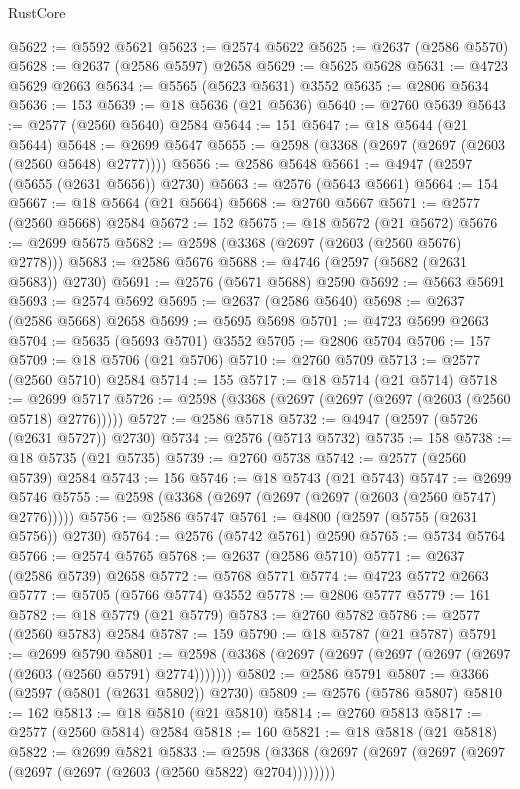 \begin{lexlean}{RustCore}
\begin{coremodule}
@5622 := @5592 @5621
@5623 := @2574 @5622
@5625 := @2637 (@2586 @5570)
@5628 := @2637 (@2586 @5597) @2658
@5629 := @5625 @5628
@5631 := @4723 @5629 @2663
@5634 := @5565 (@5623 @5631) @3552
@5635 := @2806 @5634
@5636 := 153
@5639 := @18 @5636 (@21 @5636)
@5640 := @2760 @5639
@5643 := @2577 (@2560 @5640) @2584
@5644 := 151
@5647 := @18 @5644 (@21 @5644)
@5648 := @2699 @5647
@5655 := @2598 (@3368 (@2697 (@2697 (@2603 (@2560 @5648) @2777))))
@5656 := @2586 @5648
@5661 := @4947 (@2597 (@5655 (@2631 @5656)) @2730)
@5663 := @2576 (@5643 @5661)
@5664 := 154
@5667 := @18 @5664 (@21 @5664)
@5668 := @2760 @5667
@5671 := @2577 (@2560 @5668) @2584
@5672 := 152
@5675 := @18 @5672 (@21 @5672)
@5676 := @2699 @5675
@5682 := @2598 (@3368 (@2697 (@2603 (@2560 @5676) @2778)))
@5683 := @2586 @5676
@5688 := @4746 (@2597 (@5682 (@2631 @5683)) @2730)
@5691 := @2576 (@5671 @5688) @2590
@5692 := @5663 @5691
@5693 := @2574 @5692
@5695 := @2637 (@2586 @5640)
@5698 := @2637 (@2586 @5668) @2658
@5699 := @5695 @5698
@5701 := @4723 @5699 @2663
@5704 := @5635 (@5693 @5701) @3552
@5705 := @2806 @5704
@5706 := 157
@5709 := @18 @5706 (@21 @5706)
@5710 := @2760 @5709
@5713 := @2577 (@2560 @5710) @2584
@5714 := 155
@5717 := @18 @5714 (@21 @5714)
@5718 := @2699 @5717
@5726 := @2598 (@3368 (@2697 (@2697 (@2697 (@2603 (@2560 @5718) @2776)))))
@5727 := @2586 @5718
@5732 := @4947 (@2597 (@5726 (@2631 @5727)) @2730)
@5734 := @2576 (@5713 @5732)
@5735 := 158
@5738 := @18 @5735 (@21 @5735)
@5739 := @2760 @5738
@5742 := @2577 (@2560 @5739) @2584
@5743 := 156
@5746 := @18 @5743 (@21 @5743)
@5747 := @2699 @5746
@5755 := @2598 (@3368 (@2697 (@2697 (@2697 (@2603 (@2560 @5747) @2776)))))
@5756 := @2586 @5747
@5761 := @4800 (@2597 (@5755 (@2631 @5756)) @2730)
@5764 := @2576 (@5742 @5761) @2590
@5765 := @5734 @5764
@5766 := @2574 @5765
@5768 := @2637 (@2586 @5710)
@5771 := @2637 (@2586 @5739) @2658
@5772 := @5768 @5771
@5774 := @4723 @5772 @2663
@5777 := @5705 (@5766 @5774) @3552
@5778 := @2806 @5777
@5779 := 161
@5782 := @18 @5779 (@21 @5779)
@5783 := @2760 @5782
@5786 := @2577 (@2560 @5783) @2584
@5787 := 159
@5790 := @18 @5787 (@21 @5787)
@5791 := @2699 @5790
@5801 := @2598 (@3368 (@2697 (@2697 (@2697 (@2697 (@2697 (@2603 (@2560 @5791) @2774)))))))
@5802 := @2586 @5791
@5807 := @3366 (@2597 (@5801 (@2631 @5802)) @2730)
@5809 := @2576 (@5786 @5807)
@5810 := 162
@5813 := @18 @5810 (@21 @5810)
@5814 := @2760 @5813
@5817 := @2577 (@2560 @5814) @2584
@5818 := 160
@5821 := @18 @5818 (@21 @5818)
@5822 := @2699 @5821
@5833 := @2598 (@3368 (@2697 (@2697 (@2697 (@2697 (@2697 (@2697 (@2603 (@2560 @5822) @2704))))))))

\end{coremodule}
\end{lexlean}
